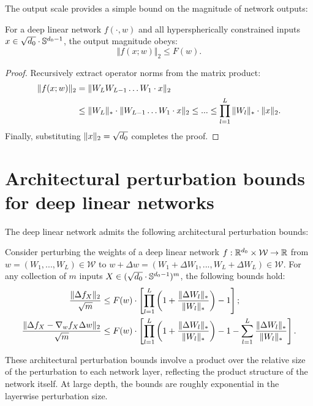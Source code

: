 \begin{refsection}
The output scale provides a simple bound on the magnitude of network outputs:
\begin{lemma}
\label{lem:lipschitz} For a deep linear network $f(\cdot,w)$ and all hyperspherically constrained inputs $x\in\sqrt{d_0}\cdot\mathbb{S}^{d_0-1}$, the output magnitude obeys:
\begin{equation}
    \Vert f(x; w) \Vert_2 \leq F(w).
\end{equation}
\end{lemma}
\begin{proof} Recursively extract operator norms from the matrix product:
    \begin{align*}
        \Vert {f(x;w)} \Vert_2 &= \Vert {W_L W_{L - 1} \dots W_1 \cdot x} \Vert_2 \\&\leq \Vert {W_L} \Vert_* \cdot \Vert {W_{L - 1} \dots W_1 \cdot x} \Vert_2 
        \leq ... \leq \prod_{l=1}^L \Vert {W_l} \Vert_* \cdot \Vert {x} \Vert_2.
    \end{align*}
    Finally, substituting $\Vert {x} \Vert_2 = \sqrt{d_0}$ completes the proof.
\end{proof}

\section{Architectural perturbation bounds for deep linear networks}

The deep linear network admits the following architectural perturbation bounds:
\begin{lemma}
\label{lem:deep_perturbation_bounds} Consider perturbing the weights of a deep linear network $f:\mathbb{R}^{d_0}\times\mathcal{W}\to\mathbb{R}$ from $w=(W_1,...,W_L)\in\mathcal{W}$ to $w+\Delta w=(W_1+\Delta W_1,...,W_L+\Delta W_L)\in\mathcal{W}$. For any collection of $m$ inputs $X\in (\sqrt{d_0}\cdot\mathbb{S}^{d_0-1})^m$, the following bounds hold:
\begin{align}
    \frac{\Vert {\Delta f_X} \Vert_2}{\sqrt{m}} &\leq F(w) \cdot \left[ \prod_{l = 1}^L \left( 1 + \frac{\Vert \Delta W_l \Vert_{*}}{\Vert W_l \Vert_{*}}\right)  - 1 \right];\label{eq:drt}\\
    \frac{\Vert {\Delta f_X - \nabla_w f_X \Delta w} \Vert_2}{\sqrt{m}} &\leq F(w) \cdot \left[ \prod_{l = 1}^L \left( 1 + \frac{\Vert \Delta W_l \Vert_{*}}{\Vert W_l \Vert_{*}}\right)  - 1 - \sum_{l = 1}^L \frac{\Vert \Delta W_l \Vert_{*}}{\Vert W_l \Vert_{*}} \right].\label{eq:jrt}
\end{align}
\end{lemma}
These architectural perturbation bounds involve a product over the relative size of the perturbation to each network layer, reflecting the product structure of the network itself. At large depth, the bounds are roughly exponential in the layerwise perturbation size.


\end{refsection}
